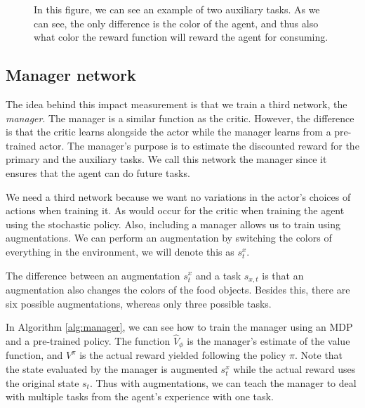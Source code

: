 \documentclass[12pt,A4]{report}
\theoremstyle{definition}
\begin{document}
\begin{figure}[H]
  \caption{In this figure, we can see an example of two auxiliary tasks. As we can see, the only difference is the color of the agent, and thus also what color the reward function will reward the agent for consuming.}
  \label{fig:aux_tasks}
\end{figure}

\subsection{Manager network}

The idea behind this impact measurement is that we train a third network, the \textit{manager}. The manager is a similar function as the critic. However, the difference is that the critic learns alongside the actor while the manager learns from a pre-trained actor. The manager's purpose is to estimate the discounted reward for the primary and the auxiliary tasks. We call this network the manager since it ensures that the agent can do future tasks.

We need a third network because we want no variations in the actor's choices of actions when training it. As would occur for the critic when training the agent using the stochastic policy. Also, including a manager allows us to train using augmentations. We can perform an augmentation by switching the colors of everything in the environment, we will denote this as $s^x_t$. 

The difference between an augmentation $s^x_t$ and a task $s_{x,t}$ is that an augmentation also changes the colors of the food objects. Besides this, there are six possible augmentations, whereas only three possible tasks. 

In Algorithm \ref{alg:manager}, we can see how to train the manager using an MDP and a pre-trained policy. The function $\hat{V}_\phi$ is the manager's estimate of the value function, and $V^\pi$ is the actual reward yielded following the policy $\pi$. Note that the state evaluated by the manager is augmented $s^x_t$ while the actual reward uses the original state $s_t$. Thus with augmentations, we can teach the manager to deal with multiple tasks from the agent's experience with one task.
\end{document}
